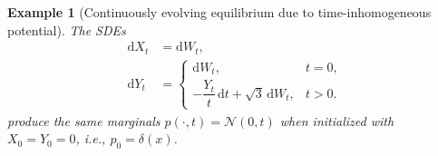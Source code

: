 \documentclass[twoside]{article}
\newcommand{\dt}{\mathrm{d}t}
\newcommand{\dWt}{\mathrm{d}W_t}
\newtheorem{ex}[theorem]{Example}
\begin{document}
\begin{ex}[Continuously evolving equilibrium due to time-inhomogeneous potential]
\label{ex: non_identifiability_time_inhomo} The SDEs 
\begin{align}
    \mathrm{d}X_t &= \mathrm{d}W_t, \\
    \mathrm{d}Y_t &=
    \begin{cases}
         \mathrm{d}W_t, & t = 0, \\
        -\dfrac{Y_t}{t} \, \mathrm{d}t + \sqrt{3} \, \mathrm{d}W_t, & t > 0.
    \end{cases}
\end{align}
produce the same marginals $p(\cdot, t)=\mathcal{N}(0,t)$ when initialized with $X_0=Y_0=0$, i.e., $p_0=\delta(x)$.  
\end{ex}
\end{document}
